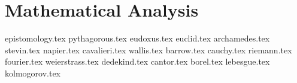 \part{Mathematical Analysis}

{epistomology.tex}
{pythagorous.tex}
{eudoxus.tex}
{euclid.tex}
{archamedes.tex}
{stevin.tex}
{napier.tex}
{cavalieri.tex}
{wallis.tex}
{barrow.tex}
{cauchy.tex}
{riemann.tex}
{fourier.tex}
{weierstrass.tex}
{dedekind.tex}
{cantor.tex}
{borel.tex}
{lebesgue.tex}
{kolmogorov.tex}